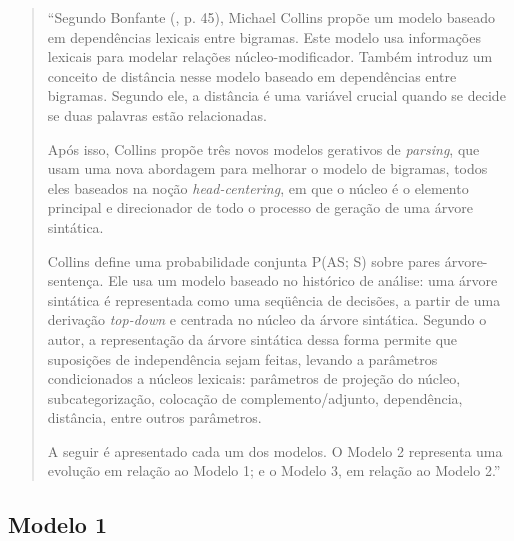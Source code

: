 \begin{quotation}
\footnotesize
``Segundo Bonfante (\cite{bonfante03}, p. 45), Michael Collins propõe um modelo baseado em dependências lexicais entre bigramas. Este modelo usa informações lexicais para modelar relações núcleo-modificador. Também introduz um conceito de distância nesse modelo baseado em dependências entre bigramas. Segundo ele, a distância é uma variável crucial quando se decide se duas palavras estão relacionadas.

Após isso, Collins \cite{collins97} propõe três novos modelos gerativos de \emph{parsing}, que usam uma nova abordagem para melhorar o modelo de bigramas, todos eles baseados na noção \emph{head-centering}, em que o núcleo é o elemento principal e direcionador de todo o processo de geração de uma árvore sintática.

Collins define uma probabilidade conjunta P(AS; S) sobre pares árvore-sentença. Ele usa um modelo baseado no histórico de análise: uma árvore sintática é representada como uma seqüência de decisões, a partir de uma derivação \emph{top-down} e centrada no núcleo da árvore sintática. Segundo o autor, a representação da árvore sintática dessa forma permite que suposições de independência sejam feitas, levando a parâmetros condicionados a núcleos lexicais: parâmetros de projeção do núcleo, subcategorização, colocação de complemento/adjunto, dependência, distância, entre outros parâmetros.

A seguir é apresentado cada um dos modelos. O Modelo 2 representa uma evolução em relação ao Modelo 1; e o Modelo 3, em relação ao Modelo 2.''
\end{quotation}

\subsection{Modelo 1}
\label{sub:modelo1}


